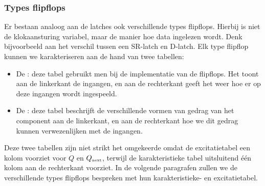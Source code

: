 \subsubsection{Types flipflops}
\label{sss:typesFlipflops}
Er bestaan analoog aan de latches ook verschillende types flipflops. Hierbij is niet de klokaansturing variabel, maar de manier hoe data ingelezen wordt. Denk bijvoorbeeld aan het verschil tussen een SR-latch en D-latch. Elk type flipflop kunnen we karakteriseren aan de hand van twee tabellen:
\begin{itemize}
 \item De : deze tabel gebruikt men bij de implementatie van de flipflops. Het toont aan de linkerkant de ingangen, en aan de rechterkant geeft het weer hoe er op deze ingangen wordt ingespeeld. 
 \item De : deze tabel beschrijft de verschillende vormen van gedrag van het component aan de linkerkant, en aan de rechterkant hoe we dit gedrag kunnen verwezenlijken met de ingangen.
\end{itemize}
Deze twee tabellen zijn niet strikt het omgekeerde omdat de excitatietabel een kolom voorziet voor $Q$ en $Q_{\mbox{\tiny{next}}}$, terwijl de karakteristieke tabel uitsluitend \'e\'en kolom aan de rechterkant voorziet. In de volgende paragrafen zullen we de verschillende types flipflops bespreken met hun karakteristieke- en excitatietabel.
